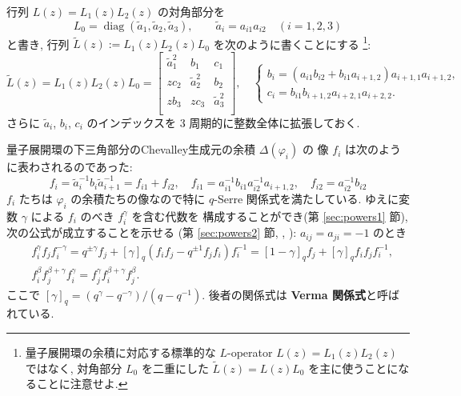 \documentclass[12pt,twoside,dvipdfm]{msjproc}
\theoremstyle{definition} %
\theoremstyle{definition} %
\theoremstyle{definition} %
\numberwithin{theorem}{section}
\numberwithin{equation}{section}
\numberwithin{figure}{section}
\numberwithin{table}{section}
\newcommand\secref[1]{第 \ref{#1} 節}
\newcommand\diag{\mathop{\mathrm{diag}}\nolimits}
\newcommand\tL{{\widetilde{L}}}
\newcommand\ta{{\tilde{a}}}
\begin{document}
行列 $L(z) = L_1(z)L_2(z)$ の対角部分を
\begin{equation*}
  L_0=\diag(\ta_1,\ta_2,\ta_3), \qquad
  \ta_i = a_{i1}a_{i2} \quad (i=1,2,3)
\end{equation*}
と書き, 行列 $\tL(z) := L_1(z)L_2(z)L_0$ を次のように書くことにする%
\footnote{量子展開環の余積に対応する標準的な $L$-operator $L(z)=L_1(z)L_2(z)$ ではなく, 
対角部分 $L_0$ を二重にした $\tL(z)=L(z)L_0$ を主に使うことになることに注意せよ.}:
\begin{equation*}
 \tL(z) = L_1(z)L_2(z)L_0 =
 \begin{bmatrix}
     \ta_1^2 & b_1     & c_1 \\
   z c_2     & \ta_2^2 & b_2 \\
   z b_3     & z c_3   & \ta_3^2 \\
 \end{bmatrix},
 \quad
 \begin{cases}
  b_i = (a_{i1}b_{i2}+b_{i1}a_{i+1,2})a_{i+1,1}a_{i+1,2}, \\
  c_i = b_{i1}b_{i+1,2}a_{i+2,1}a_{i+2,2}.
 \end{cases}
\end{equation*}
さらに $\ta_i$, $b_i$, $c_i$ のインデックスを $3$ 周期的に整数全体に拡張しておく.

量子展開環の下三角部分のChevalley生成元の余積 $\Delta(\varphi_i)$ の
像 $f_i$ は次のように表わされるのであった:
\begin{equation*}
  f_i = \ta_i^{-1}b_i\ta_{i+1}^{-1} = f_{i1} + f_{i2}, \quad
  f_{i1} = a_{i1}^{-1}b_{i1}a_{i2}^{-1}a_{i+1,2}, \quad
  f_{i2} = a_{i2}^{-1}b_{i2}
\end{equation*}
$f_i$ たちは $\varphi_i$ の余積たちの像なので特に $q$-Serre 関係式を満たしている. 
ゆえに変数 $\gamma$ による $f_i$ のべき $f_i^\gamma$ を含む代数を
構成することができ(\secref{sec:powers1}), 次の公式が成立することを示せる
(\secref{sec:powers2}, \cite{Kuroki-W}, \cite{Kuroki-Tau}): $a_{ij}=a_{ji}=-1$ のとき
\begin{align*}
 &
 f_i^\gamma f_j f_i^{-\gamma}
 = q^{\pm\gamma}f_j+[\gamma]_q(f_i f_j - q^{\pm1} f_j f_i)f_i^{-1}
 = [1-\gamma]_q f_j + [\gamma]_q f_i f_j f_i^{-1},
 \\ &
 f_i^\beta f_j^{\beta+\gamma} f_i^\gamma
 = f_j^\gamma f_i^{\beta+\gamma} f_j^\beta.
\end{align*}
ここで $[\gamma]_q = (q^\gamma-q^{-\gamma})/(q-q^{-1})$.
後者の関係式は {\bf Verma 関係式}と呼ばれている.
\end{document}
